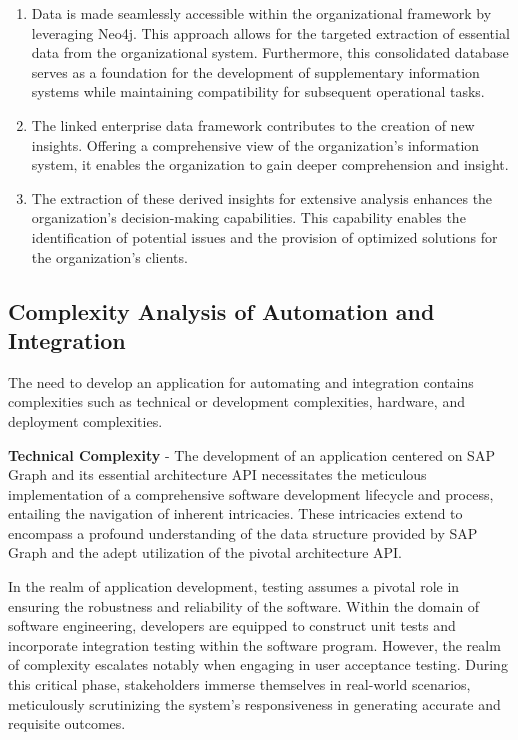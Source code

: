 \documentclass{article}
\begin{document}
\begin{enumerate}
    \item Data is made seamlessly accessible within the organizational framework by leveraging Neo4j. This approach allows for the targeted extraction of essential data from the organizational system. Furthermore, this consolidated database serves as a foundation for the development of supplementary information systems while maintaining compatibility for subsequent operational tasks.
    
    \item The linked enterprise data framework contributes to the creation of new insights. Offering a comprehensive view of the organization's information system, it enables the organization to gain deeper comprehension and insight.
    
    \item The extraction of these derived insights for extensive analysis enhances the organization's decision-making capabilities. This capability enables the identification of potential issues and the provision of optimized solutions for the organization's clients.
\end{enumerate}

\subsection{Complexity Analysis of Automation and Integration}

The need to develop an application for automating and integration contains complexities such as technical or development complexities, hardware, and deployment complexities.

\textbf{Technical Complexity} - The development of an application centered on SAP Graph and its essential architecture API necessitates the meticulous implementation of a comprehensive software development lifecycle and process, entailing the navigation of inherent intricacies. These intricacies extend to encompass a profound understanding of the data structure provided by SAP Graph and the adept utilization of the pivotal architecture API.

In the realm of application development, testing assumes a pivotal role in ensuring the robustness and reliability of the software. Within the domain of software engineering, developers are equipped to construct unit tests and incorporate integration testing within the software program. However, the realm of complexity escalates notably when engaging in user acceptance testing. During this critical phase, stakeholders immerse themselves in real-world scenarios, meticulously scrutinizing the system's responsiveness in generating accurate and requisite outcomes.
\end{document}
